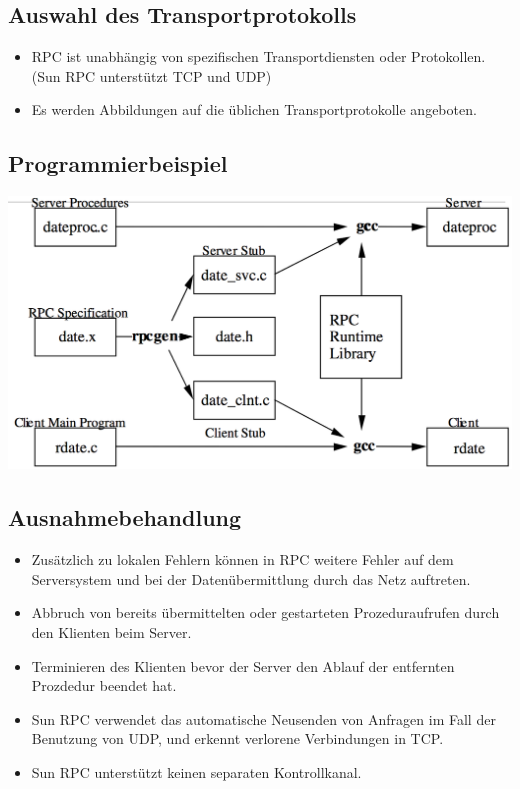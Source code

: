 \documentclass[10pt]{article}
\begin{document}
\subsection{Auswahl des Transportprotokolls}
\begin{itemize}
	\item RPC ist unabhängig von spezifischen Transportdiensten oder Protokollen. (Sun RPC unterstützt TCP und UDP)
	\item Es werden Abbildungen auf die üblichen Transportprotokolle angeboten.
\end{itemize}

\subsection{Programmierbeispiel}
\begin{center}
	\includegraphics[scale=0.3]{rpc-beispiel.png}\\
\end{center}

\subsection{Ausnahmebehandlung}
\begin{itemize}
	\item Zusätzlich zu lokalen Fehlern können in RPC weitere Fehler auf dem Serversystem und bei der Datenübermittlung durch das Netz auftreten.
	\item Abbruch von bereits übermittelten oder gestarteten Prozeduraufrufen durch den Klienten beim Server.
	\item Terminieren des Klienten bevor der Server den Ablauf der entfernten Prozdedur beendet hat.
	\item Sun RPC verwendet das automatische Neusenden von Anfragen im Fall der Benutzung von UDP, und erkennt verlorene Verbindungen in TCP.
	\item Sun RPC unterstützt keinen separaten Kontrollkanal.
\end{itemize}
\end{document}
